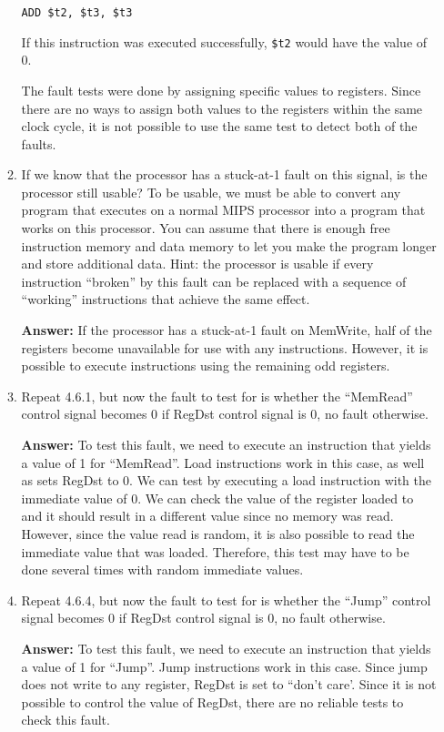 \documentclass[12pt]{article}
\begin{document}
\begin{enumerate}
\begin{enumerate}[label=4.6.\arabic*]
    \texttt{ADD \$t2, \$t3, \$t3}

    If this instruction was executed successfully, \texttt{\$t2} would have the value of 0.

    The fault tests were done by assigning specific values to registers. Since there are no ways to assign both values to the registers within the same clock cycle, it is not possible to use the same test to detect both of the faults.

    \item If we know that the processor has a stuck-at-1 fault on this signal, is the processor still usable? To be usable, we must be able to convert any program that executes on a normal MIPS processor into a program that works on this processor. You can assume that there is enough free instruction memory and data memory to let you make the program longer and store additional data. Hint: the processor is usable if every instruction ``broken'' by this fault can be replaced with a sequence of ``working'' instructions that achieve the same effect.

    \textbf{Answer:} If the processor has a stuck-at-1 fault on MemWrite, half of the registers become unavailable for use with any instructions. However, it is possible to execute instructions using the remaining odd registers. 

    \item Repeat 4.6.1, but now the fault to test for is whether the ``MemRead'' control signal becomes 0 if RegDst control signal is 0, no fault otherwise.

    \textbf{Answer:} To test this fault, we need to execute an instruction that yields a value of 1 for ``MemRead''. Load instructions work in this case, as well as sets RegDst to 0. We can test by executing a load instruction with the immediate value of 0. We can check the value of the register loaded to and it should result in a different value since no memory was read. However, since the value read is random, it is also possible to read the immediate value that was loaded. Therefore, this test may have to be done several times with random immediate values.

    \item Repeat 4.6.4, but now the fault to test for is whether the ``Jump'' control signal becomes 0 if RegDst control signal is 0, no fault otherwise.

    \textbf{Answer:} To test this fault, we need to execute an instruction that yields a value of 1 for ``Jump''. Jump instructions work in this case. Since jump does not write to any register, RegDst is set to ``don't care'. Since it is not possible to control the value of RegDst, there are no reliable tests to check this fault.


\end{enumerate}
\end{enumerate}
\end{document}

